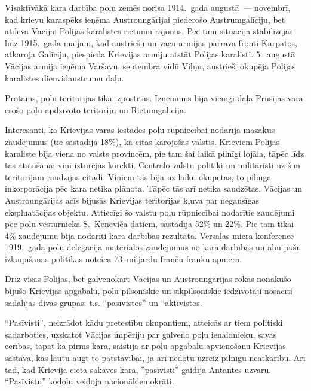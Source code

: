 \documentclass[twoside,a5paper,12pt,fleqn,openany]{extbook}
\begin{document}
Visaktīvākā kara darbība poļu zemēs norisa 1914.~gada augustā~--- novembrī, kad krievu karaspēks ieņēma Austroungārijai piederošo Austrumgalīciju, bet atdeva Vācijai Polijas karalistes rietumu rajonus. Pēc tam situācija stabilizējās līdz 1915.~gada maijam, kad austriešu un vācu armijas pārrāva fronti Karpatos, atkaroja Galīciju, piespieda Krievijas armiju atstāt Polijas karalisti. 5.~augustā Vācijas armija ieņēma Varšavu, septembra vidū Viļņu, austrieši okupēja Polijas karalistes dienvidaustrumu daļu.

Protams, poļu teritorijas tika izpostītas. Izņēmums bija vienīgi daļa Prūsijas varā esošo poļu apdzīvoto teritoriju un Rietumgalīcija.

Interesanti, ka Krievijas varas iestādes poļu rūpniecībai nodarīja mazākus zaudējumus (tie sastādīja 18\%), kā citas karojošās valstis. Krieviem Polijas karaliste bija viena no valsts provincēm, pie tam šai laikā pilnīgi lojāla, tāpēc līdz tās atstāšanai viņi izturējās korekti. Centrālo valstu politiķi un militāristi uz šīm teritorijām raudzījās citādi. Viņiem tās bija uz laiku okupētas, to pilnīga inkorporācija pēc kara netika plānota. Tāpēc tās arī netika saudzētas. Vācijas un Austroungārijas acīs bijušās Krievijas teritorijas kļuva par negausīgas ekspluatācijas objektu. Attiecīgi šo valstu poļu rūpniecībai nodarītie zaudējumi pēc poļu vēsturnieka S.~Keņeviča datiem, sastādīja 52\% un 22\%. Pie tam tikai 4\% zaudējumu bija nodarīti kara darbības rezultātā. Versaļas miera konferencē 1919.~gadā poļu delegācija materiālos zaudējumus no kara darbībās un abu pušu izlaupīšanas politikas noteica 73~miljardu franču franku apmērā.

Drīz visas Polijas, bet galvenokārt Vācijas un Austroungārijas rokās nonākušo bijušo Krievijas apgabalu, poļu pilsoniskie un sīkpilsoniskie iedzīvotāji nosacīti sadalījās divās grupās: t.s. ``pasīvistos'' un ``aktīvistos.

``Pasīvisti'', neizrādot kādu pretestību okupantiem, atteicās ar tiem politiski sadarboties, uzskatot Vācijas impēriju par galveno poļu ienaidnieku, savas cerības, tāpat kā pirms kara, saistīja ar poļu apgabalu apvienošanu Krievijas sastāvā, kas ļautu augt to patstāvībai, ja arī nedotu uzreiz pilnīgu neatkarību. Arī tad, kad Krievija cieta sakāves karā, ''pasīvisti'' gaidīja Antantes uzvaru. ``Pasīvistu'' kodolu veidoja nacionāldemokrāti.
\end{document}
